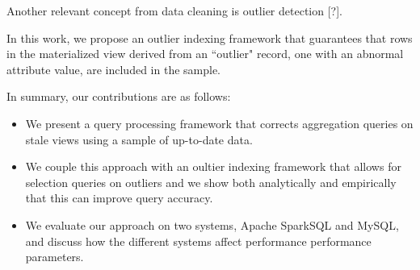 Another relevant concept from data cleaning is outlier detection {[}?{]}.

In this work, we propose an outlier indexing framework that guarantees that
rows in the materialized view derived from an ``outlier" record, one with
an abnormal attribute value, are included in the sample.

In summary, our contributions are as follows:
\begin{itemize}
\item We present a query processing framework that corrects aggregation queries on stale
views using a sample of up-to-date data.
\item We couple this approach with an oultier indexing framework that allows
for selection queries on outliers and we show both analytically and empirically that 
this can improve query accuracy.
\item We evaluate our approach on two systems, Apache SparkSQL and MySQL,
and discuss how the different systems affect performance performance
parameters.
\end{itemize}
\fi
